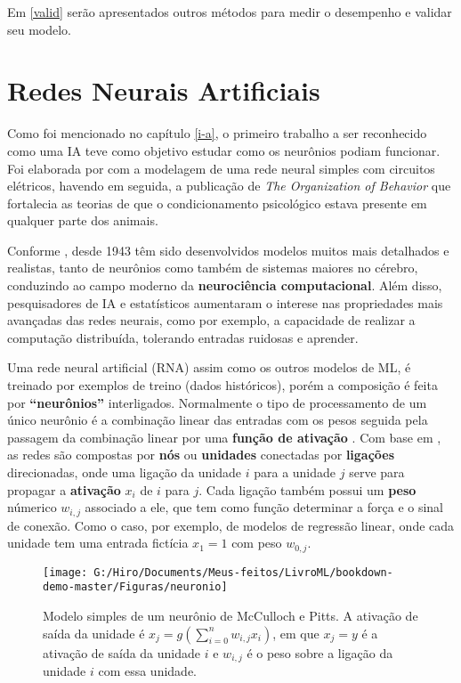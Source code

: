 \documentclass[
  openany]{book}
\begin{document}
Em \ref{valid} serão apresentados outros métodos para medir o desempenho e validar seu modelo.

\hypertarget{redesneurais}{%
\section{Redes Neurais Artificiais}\label{redesneurais}}

Como foi mencionado no capítulo \ref{i-a}, o primeiro trabalho a ser reconhecido como uma IA teve como objetivo estudar como os neurônios podiam funcionar. Foi elaborada por \citet{mcculloch1943logical} com a modelagem de uma rede neural simples com circuitos elétricos, havendo em seguida, a publicação de \emph{The Organization of Behavior} \citep{hebb1949organization} que fortalecia as teorias de que o condicionamento psicológico estava presente em qualquer parte dos animais.

Conforme \citet{russel2004inteligencia}, desde 1943 têm sido desenvolvidos modelos muitos mais detalhados e realistas, tanto de neurônios como também de sistemas maiores no cérebro, conduzindo ao campo moderno da \textbf{neurociência computacional}. Além disso, pesquisadores de IA e estatísticos aumentaram o interese nas propriedades mais avançadas das redes neurais, como por exemplo, a capacidade de realizar a computação distribuída, tolerando entradas ruidosas e aprender.

Uma rede neural artificial (RNA) assim como os outros modelos de ML, é treinado por exemplos de treino (dados históricos), porém a composição é feita por \textbf{``neurônios''} interligados. Normalmente o tipo de processamento de um único neurônio é a combinação linear das entradas com os pesos seguida pela passagem da combinação linear por uma \textbf{função de ativação} \citep{rauber2005redes}. Com base em \citet{russel2004inteligencia}, as redes são compostas por \textbf{nós} ou \textbf{unidades} conectadas por \textbf{ligações} direcionadas, onde uma ligação da unidade \(i\) para a unidade \(j\) serve para propagar a \textbf{ativação} \(x_i\) de \(i\) para \(j\). Cada ligação também possui um \textbf{peso} númerico \(w_{i,j}\) associado a ele, que tem como função determinar a força e o sinal de conexão. Como o caso, por exemplo, de modelos de regressão linear, onde cada unidade tem uma entrada fictícia \(x_1=1\) com peso \(w_{0,j}\).

\begin{figure}

{\centering \texttt{[image: G:/Hiro/Documents/Meus-feitos/LivroML/bookdown-demo-master/Figuras/neuronio]} 

}

\caption{Modelo simples de um neurônio de McCulloch e Pitts. A ativação de saída da unidade é \(x_j=g(\sum^n_{i=0}w_{i,j}x_i)\), em que \(x_j=y\) é a ativação de saída da unidade \(i\) e \(w_{i,j}\) é o peso sobre a ligação da unidade \(i\) com essa unidade.}\label{fig:neuronio}
\end{figure}
\end{document}
